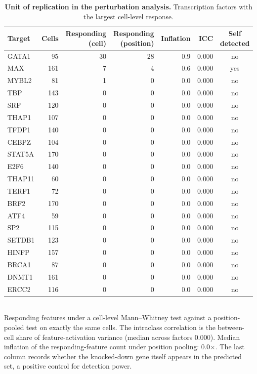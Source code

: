 \begin{table}[htbp]
\centering
\caption{\textbf{Unit of replication in the perturbation analysis.} Transcription factors with the largest cell-level response.}
\label{tab:cell_level}
\smallskip
\small
\begin{tabular}{lrrrrrc}
\toprule
Target & Cells & Responding (cell) & Responding (position) & Inflation & ICC & Self detected \\
\midrule
GATA1 & 95 & 30 & 28 & 0.9 & 0.000 & no \\
MAX & 161 & 7 & 4 & 0.6 & 0.000 & yes \\
MYBL2 & 81 & 1 & 0 & 0.0 & 0.000 & no \\
TBP & 143 & 0 & 0 & 0.0 & 0.000 & no \\
SRF & 120 & 0 & 0 & 0.0 & 0.000 & no \\
THAP1 & 107 & 0 & 0 & 0.0 & 0.000 & no \\
TFDP1 & 140 & 0 & 0 & 0.0 & 0.000 & no \\
CEBPZ & 104 & 0 & 0 & 0.0 & 0.000 & no \\
STAT5A & 170 & 0 & 0 & 0.0 & 0.000 & no \\
E2F6 & 140 & 0 & 0 & 0.0 & 0.000 & no \\
THAP11 & 60 & 0 & 0 & 0.0 & 0.000 & no \\
TERF1 & 72 & 0 & 0 & 0.0 & 0.000 & no \\
BRF2 & 170 & 0 & 0 & 0.0 & 0.000 & no \\
ATF4 & 59 & 0 & 0 & 0.0 & 0.000 & no \\
SP2 & 115 & 0 & 0 & 0.0 & 0.000 & no \\
SETDB1 & 123 & 0 & 0 & 0.0 & 0.000 & no \\
HINFP & 157 & 0 & 0 & 0.0 & 0.000 & no \\
BRCA1 & 87 & 0 & 0 & 0.0 & 0.000 & no \\
DNMT1 & 161 & 0 & 0 & 0.0 & 0.000 & no \\
ERCC2 & 116 & 0 & 0 & 0.0 & 0.000 & no \\
\bottomrule
\end{tabular}
\\[2pt]
\footnotesize Responding features under a cell-level Mann--Whitney test against a position-pooled test on exactly the same cells. The intraclass correlation is the between-cell share of feature-activation variance (median across factors 0.000). Median inflation of the responding-feature count under position pooling: 0.0$\times$. The last column records whether the knocked-down gene itself appears in the predicted set, a positive control for detection power.
\end{table}
